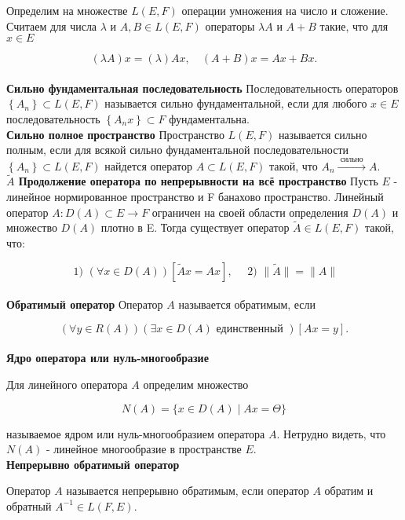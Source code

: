 Определим на множестве $L(E, F)$ операции умножения на число и сложение. Считаем для числа $\lambda$ и $A, B \in L(E, F)$ операторы $\lambda A$ и $A+B$ такие, что для $x \in E$

$$
	(\lambda A) x=(\lambda) A x, \quad(A+B) x=A x+B x .
$$\\

\textbf{Сильно фундаментальная последовательность}
Последовательность операторов $\left\{A_{n}\right\} \subset L(E, F)$ называется сильно фундаментальной, если для любого $x \in E$ последовательность $\left\{A_{n} x\right\} \subset F$ фундаментальна.\\

\textbf{Сильно полное пространство}
Пространство $L(E, F)$ называется сильно полным, если для всякой сильно фундаментальной последовательности $\left\{A_{n}\right\} \subset L(E, F)$ найдется оператор $A \subset L(E, F)$ такой, что $A_{n} \stackrel{\text { сильно }}{\longrightarrow} A$.\\

\textbf{$\widetilde{A}$ Продолжение оператора по непрерывности на всё пространство}
Пусть $E$ - линейное нормированное пространство и F банахово пространство. Линейный оператор $A: D(A) \subset E \rightarrow F$ ограничен на своей области определения $D(A)$ и множество $D(A)$ плотно в E. Тогда существует оператор $\widetilde{A} \in L(E, F)$ такой, что:

$$
\text { 1) }(\forall x \in D(A))[\widetilde{A} x=A x], \quad \text { 2) }\|\widetilde{A}\|=\|A\|
$$\\

\textbf{Обратимый оператор}
Оператор $A$ называется обратимым, если

$$
(\forall y \in R(A))(\exists x \in D(A) \text { единственный })[A x=y] .
$$\\

\textbf{Ядро оператора или нуль-многообразие}

Для линейного оператора $A$ определим множество

$$
N(A)=\{x \in D(A) \mid A x=\Theta\}
$$

называемое ядром или нуль-многообразием оператора $A$. Нетрудно видеть, что $N(A)$ - линейное многообразие в пространстве $E$.\\

\textbf{Непрерывно обратимый оператор}

Оператор $A$ называется непрерывно обратимым, если оператор $A$ обратим и обратный $A^{-1} \in L(F, E)$.\\

